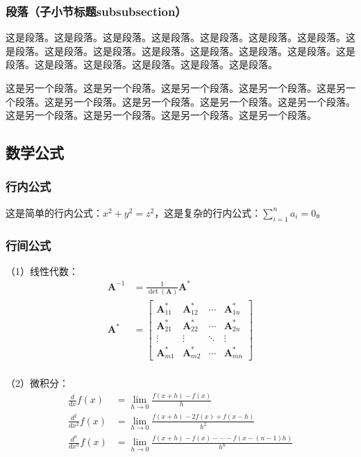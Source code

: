 \begin{ujnbody}
    \subsubsection{段落（子小节标题subsubsection）}
    这是段落。这是段落。这是段落。这是段落。这是段落。这是段落。这是段落。这是段落。这是段落。这是段落。这是段落。这是段落。这是段落。这是段落。这是段落。这是段落。这是段落。这是段落。这是段落。这是段落。

    这是另一个段落。这是另一个段落。这是另一个段落。这是另一个段落。这是另一个段落。这是另一个段落。这是另一个段落。这是另一个段落。这是另一个段落。这是另一个段落。这是另一个段落。这是另一个段落。这是另一个段落。
    \subsection{数学公式}
    \subsubsection{行内公式}
    这是简单的行内公式：$x^2+y^2=z^2$，这是复杂的行内公式：$\sum_{i=1}^n a_i=0$。
    \subsubsection{行间公式}
    （1）线性代数：
    \begin{equation}
        \begin{split}
            \mathbf{A}^{-1} &= \frac{1}{\det(\mathbf{A})}\mathbf{A}^* \\
            \mathbf{A}^* &= \begin{bmatrix}
                \mathbf{A}_{11}^* & \mathbf{A}_{12}^* & \cdots & \mathbf{A}_{1n}^* \\
                \mathbf{A}_{21}^* & \mathbf{A}_{22}^* & \cdots & \mathbf{A}_{2n}^* \\
                \vdots & \vdots & \ddots & \vdots \\
                \mathbf{A}_{m1}^* & \mathbf{A}_{m2}^* & \cdots & \mathbf{A}_{mn}^*
            \end{bmatrix} \\
        \end{split}
    \end{equation}

    （2）微积分：
    \begin{equation}
        \begin{split}
            \frac{d}{dx}f(x) &= \lim_{h \to 0}\frac{f(x+h)-f(x)}{h} \\
            \frac{d^2}{dx^2}f(x) &= \lim_{h \to 0}\frac{f(x+h)-2f(x)+f(x-h)}{h^2} \\
            \frac{d^n}{dx^n}f(x) &= \lim_{h \to 0}\frac{f(x+h)-f(x)-\cdots-f(x-(n-1)h)}{h^n}
        \end{split}
        \label{eq:2}
    \end{equation}


\end{ujnbody}
